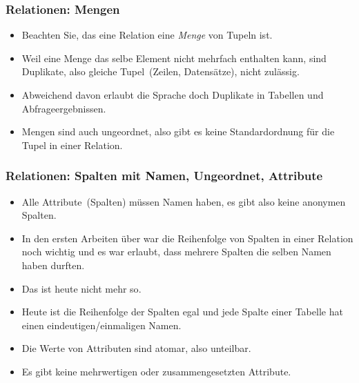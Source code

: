 \documentclass[aspectratio=169,mathserif,notheorems]{beamer}%
\begin{document}
%
%
\begin{frame}%
\frametitle{Relationen: Mengen}%
\begin{itemize}%
%
\item Beachten Sie, das eine Relation eine \emph{Menge} von Tupeln ist.%
%
\item<2-> Weil eine Menge das selbe Element nicht mehrfach enthalten kann, sind Duplikate, also gleiche Tupel~(Zeilen, Datensätze), nicht zulässig\cite{C20245YOQ}.%
%
\item<3-> Abweichend davon erlaubt die Sprache  doch Duplikate in Tabellen und Abfrageergebnissen\cite{C20245YOQ}.%
%
\item<4-> Mengen sind auch ungeordnet, also gibt es keine Standardordnung für die Tupel in einer Relation.%
%
\end{itemize}%
\end{frame}%
%
%
\begin{frame}%
\frametitle{Relationen: Spalten mit Namen, Ungeordnet, Attribute}%
\begin{itemize}%
%
\item Alle Attribute~(Spalten) müssen Namen haben, es gibt also keine anonymen Spalten\cite{S2024D:LDMRMRA}.%
%
\item<2-> In den ersten Arbeiten über \cite{C1970ARMODFLSDB} war die Reihenfolge von Spalten in einer Relation noch wichtig und es war erlaubt, dass mehrere Spalten die selben Namen haben durften.%
%
\item<3-> Das ist heute \alert{nicht mehr so}.%
%
\item<4-> Heute ist die Reihenfolge der Spalten egal und jede Spalte einer Tabelle hat einen eindeutigen/einmaligen Namen\cite{S2024D:LDMRMRA}.%
%
\item<5-> Die Werte von Attributen sind atomar, also unteilbar.%
%
\item<6-> Es gibt keine mehrwertigen oder zusammengesetzten Attribute\cite{S2024D:LDMRMRA,SS2005EIDDDFDB:SDLDUTRDM}.%
%
\end{itemize}%
\end{frame}%
%
%
%
%
\end{document}
